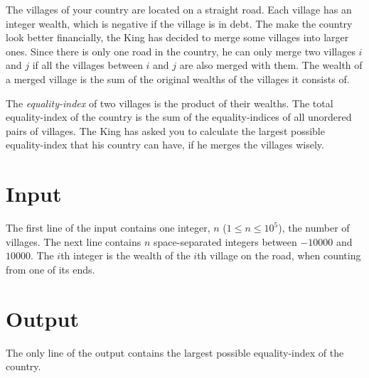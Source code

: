 
The villages of your country are located on a straight road.
Each village has an integer wealth, which is negative if the village is in debt.
The make the country look better financially, the King has decided to merge some villages into larger ones.
Since there is only one road in the country, he can only merge two villages $i$ and $j$ if all the villages between $i$ and $j$ are also merged with them.
The wealth of a merged village is the sum of the original wealths of the villages it consists of.

The \textit{equality-index} of two villages is the product of their wealths.
The total equality-index of the country is the sum of the equality-indices of all unordered pairs of villages.
The King has asked you to calculate the largest possible equality-index that his country can have, if he merges the villages wisely.

\section*{Input}
The first line of the input contains one integer, $n$ ($1 \leq n \leq 10^5$),  the number of villages.
The next line contains $n$ space-separated integers between $-10000$ and $10000$.
The $i$th integer is the wealth of the $i$th village on the road, when counting from one of its ends.


\section*{Output}
The only line of the output contains the largest possible equality-index of the country.
